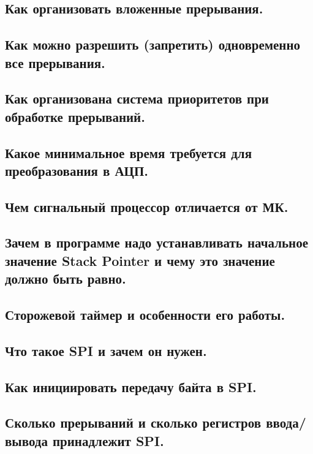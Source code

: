 \subsection{Как организовать вложенные прерывания.}


\subsection{Как можно разрешить (запретить) одновременно все прерывания.}


\subsection{Как организована система приоритетов при обработке прерываний. }


\subsection{Какое минимальное время требуется для преобразования в АЦП.}


\subsection{Чем сигнальный процессор отличается от МК.}


\subsection{Зачем в программе надо устанавливать начальное значение Stack Pointer и чему это значение должно быть равно.}


\subsection{Сторожевой таймер и особенности его работы.}


\subsection{Что такое SPI и зачем он нужен.}


\subsection{Как инициировать передачу байта в SPI.}


\subsection{Сколько прерываний и сколько регистров ввода/вывода принадлежит SPI.}


